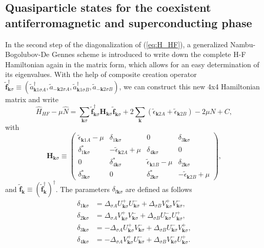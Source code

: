 \documentclass[aps,prb,showpacs,reprint]{revtex4-1}
\begin{document}
\subsection{Quasiparticle states for the coexistent antiferromagnetic and
superconducting phase}
In the second step of the diagonalization of (\ref{eq:H_HF}), a generalized
Nambu-Bogolubov-De Gennes scheme is
introduced to write down the complete H-F Hamiltonian again in the matrix
form, which allows for an easy determination of its eigenvalues. With the help
of
composite creation operator
$\mathbf{\tilde{f}}^{\dagger}_{\mathbf{k}\sigma}\equiv(\tilde{a}^{\dagger}
_{\mathbf{k}1\sigma A},\tilde{a}_{-\mathbf{k}
2\sigma A},\tilde{a}^{\dagger}_{\mathbf{k}1\sigma
B},\tilde{a}_{-\mathbf{k}2\sigma B})$, we can construct this new 4x4
Hamiltonian matrix and write
\begin{equation}
\hat{H}_{HF}-\mu\hat{N}=\sum_{\mathbf{k}\sigma}
\mathbf{\tilde{f}}_{\mathbf{k}\sigma}^{\dagger}\mathbf{H}_{\mathbf{k}\sigma}
\mathbf{\tilde{f}}_{\mathbf{k}\sigma}+2\sum_{\mathbf{k}}(\tilde{\epsilon}_{
\mathbf{k}2 A}+\tilde{\epsilon}_{\mathbf{k}2 B} ) -2\mu N+C,
\label{eq:H_HF_matrix}
\end{equation}
with
\begin{equation}
\mathbf{H}_{\mathbf{k}\sigma}\equiv\left(\begin{array}{cccc}
\tilde{\epsilon}_{\mathbf{k}1 A}-\mu & \delta_{1\mathbf{k}\sigma}
& 0 & \delta_{3\mathbf{k}\sigma}\\
\delta_{1\mathbf{k}\sigma}^* &
-\tilde{\epsilon}_{\mathbf{k}2 A}+\mu &
\delta_{4\mathbf{k}\sigma} & 0\\
0 & \delta_{4\mathbf{k}\sigma}^* & \tilde{\epsilon}_{\mathbf{k}1 B}-\mu &
\delta_{2\mathbf{k}\sigma}\\
\delta_{3\mathbf{k}\sigma}^* & 0 & \delta_{2\mathbf{k}\sigma}^* &
-\tilde{\epsilon}_{\mathbf{k}2 B}+\mu
\end{array} \right),
\label{eq:matrix_H2}
\end{equation}
and $\mathbf{\tilde{f}}_{\mathbf{k}}\equiv(\mathbf{\tilde{f}}^{\dagger}_{\mathbf{k}})^{\dagger}$.
The parameters $\delta_{l\mathbf{k}\sigma}$ are defined as follows
\begin{equation}
\begin{split}
 \delta_{1\mathbf{k}\sigma}&=\Delta_{\sigma
A}U^+_{\mathbf{k}\sigma}U^-_{\mathbf{k}\sigma}+\Delta_{\sigma
B}V^+_{\mathbf{k}\sigma}V^-_{\mathbf{k}\sigma},\\
 \delta_{2\mathbf{k}\sigma}&=\Delta_{\sigma
A}V^+_{\mathbf{k}\sigma}V^-_{\mathbf{k}\sigma}+\Delta_{\sigma
B}U^-_{\mathbf{k}\sigma}U^+_{\mathbf{k}\sigma},\\
 \delta_{3\mathbf{k}\sigma}&=-\Delta_{\sigma
A}U^+_{\mathbf{k}\sigma}V^-_{\mathbf{k}\sigma}+\Delta_{\sigma
B}U^-_{\mathbf{k}\sigma}V^+_{\mathbf{k}\sigma},\\
 \delta_{4\mathbf{k}\sigma}&=-\Delta_{\sigma
A}V^+_{\mathbf{k}\sigma}U^-_{\mathbf{k}\sigma}+\Delta_{\sigma
B}V^-_{\mathbf{k}\sigma}U^+_{\mathbf{k}\sigma}.
\end{split}
\end{equation}
\end{document}
